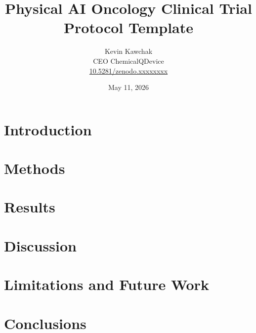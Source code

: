 \documentclass[11pt]{article}
\title{Physical AI Oncology Clinical Trial Protocol Template}
\author{
  Kevin Kawchak\hspace{2pt}\orcidicon{0009-0007-5457-8667} \\
  CEO ChemicalQDevice\\
  \href{https://doi.org/10.5281/zenodo.xxxxxxxx}{10.5281/zenodo.xxxxxxxx} \\
}
\date{May 11, 2026}
\begin{document}
\maketitle

\begin{abstract}

\end{abstract}

\keywords{ }

\vspace{-0.2cm}

\section{Introduction}
\label{sec:introduction}


\tableofcontents
\vspace{0.4cm}

\newpage
\section{Methods}
\label{sec:methods}

\newpage

\section{Results}
\label{sec:results}

\newpage

\section{Discussion}
\label{sec:discussion}


\section{Limitations and Future Work}
\label{sec:limitations}

\newpage

\section{Conclusions}
\label{sec:conclusions}

\newpage

{}
\begingroup
\raggedright


\endgroup
\newpage


\end{document}
